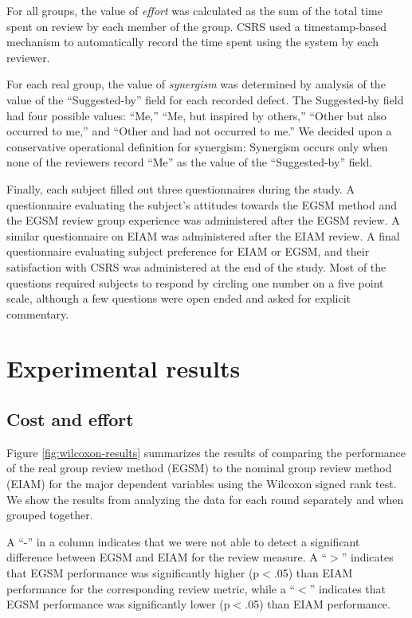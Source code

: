 For all groups, the value of {\em effort} was calculated as the sum of the
total time spent on review by each member of the group.  CSRS used a
timestamp-based mechanism to automatically record the time spent 
using the system by each reviewer. 

For each real group, the value of {\em synergism} was determined by analysis
of the value of the ``Suggested-by'' field for each recorded defect. The
Suggested-by field had four possible values: ``Me,'' ``Me, but inspired by
others,'' ``Other but also occurred to me,'' and ``Other and had not
occurred to me.''  We decided upon a conservative operational definition
for synergism: Synergism occurs only when none of the reviewers record
``Me'' as the value of the ``Suggested-by'' field.

Finally, each subject filled out three questionnaires during the study.  A
questionnaire evaluating the subject's attitudes towards the EGSM method
and the EGSM review group experience was administered after the EGSM
review. A similar questionnaire on EIAM was administered after the EIAM
review. A final questionnaire evaluating subject preference for EIAM or
EGSM, and their satisfaction with CSRS was administered at the end of the
study.  Most of the questions required subjects to respond by circling
one number on a five point scale, although a few questions were open ended
and asked for explicit commentary. 


\section{Experimental results}


\subsection{Cost and effort}

Figure \ref{fig:wilcoxon-results} summarizes the results of comparing the
performance of the real group review method (EGSM) to the nominal group
review method (EIAM) for the major dependent variables using the Wilcoxon
signed rank test.  We show the results from analyzing the data for each
round separately and when grouped together.

A ``-'' in a column indicates that we were not able to detect a significant
difference between EGSM and EIAM for the review measure. A
``$>$'' indicates that EGSM performance was significantly
higher (p$<$.05) than EIAM performance for the corresponding
review metric, while a ``$<$'' indicates that EGSM performance was
significantly lower (p$<$.05) than EIAM performance.


